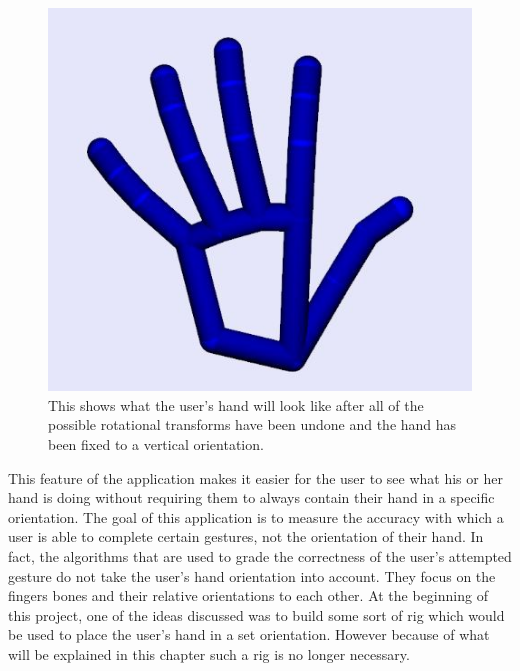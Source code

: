 \begin{figure}[H]
\centering
\includegraphics[scale=0.45]{Figures/4_handFinalFix.JPG}
\caption[Hand Fixed to Vertical Orientation]{This shows what the user's hand will look like after all of the possible rotational transforms have been undone and the hand has been fixed to a vertical orientation.}
\label{fig:handFinalResult}
\end{figure}
This feature of the application makes it easier for the user to see what his or her hand is doing without requiring them to always contain their hand in a specific orientation. The goal of this application is to measure the accuracy with which a user is able to complete certain gestures, not the orientation of their hand. In fact, the algorithms that are used to grade the correctness of the user's attempted gesture do not take the user's hand orientation into account. They focus on the fingers bones and their relative orientations to each other. At the beginning of this project, one of the ideas discussed was to build some sort of rig which would be used to place the user's hand in a set orientation. However because of what will be explained in this chapter such a rig is no longer necessary.




